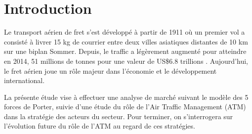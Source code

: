 
\pagebreak

\section{Introduction}

Le transport aérien de fret s'est développé à partir de 1911 où un
premier vol a consisté à livrer 15 kg de courrier entre deux villes asiatiques
distantes de 10 km sur une biplan Sommer. Depuis, le traffic a légèrement augmenté pour
atteindre en 2014, 51 millions de tonnes pour une valeur de US\$6.8 trillions \cite{RePEc:eee:jaitra:v:61:y:2017:i:c:p:34-40}.
Aujourd'hui, le fret aérien joue un rôle majeur dans l'économie et le développement international.

 
La présente étude vise à effectuer une analyse de marché suivant le modèle des 5 forces de Porter,
suivie d'une étude du rôle de l'Air Traffic Management (ATM) dans la stratégie des acteurs du secteur.
Pour terminer, on s'interrogera sur l'évolution future du rôle de l'ATM au regard de ces stratégies. 
   



